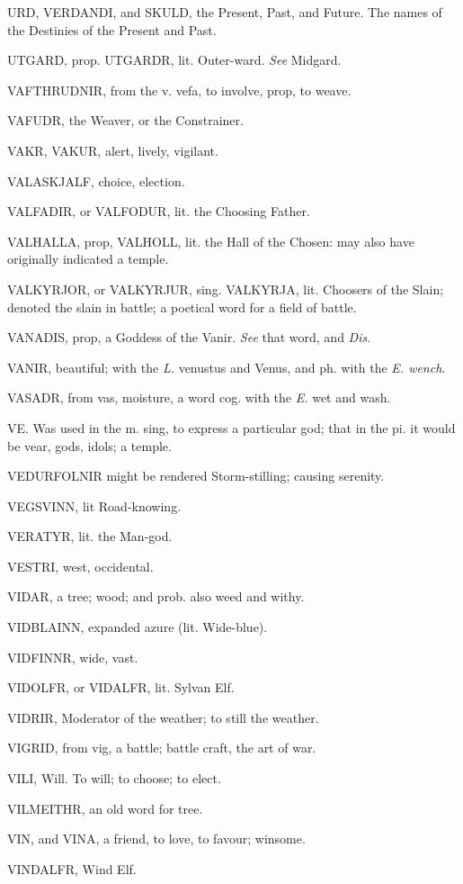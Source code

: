 URD, VERDANDI, and SKULD, the Present, Past, and Future. The names of
the Destinies of the Present and Past.

UTGARD, prop. UTGARDR, lit. Outer-ward. \emph{See} Midgard.

VAFTHRUDNIR, from the v. vefa, to involve, prop, to weave.

VAFUDR, the Weaver, or the Constrainer.

VAKR, VAKUR, alert, lively, vigilant.

VALASKJALF, choice, election.

VALFADIR, or VALFODUR, lit. the Choosing Father.

VALHALLA, prop, VALHOLL, lit. the Hall of the Chosen: may also have
originally indicated a temple.

VALKYRJOR, or VALKYRJUR, sing. VALKYRJA, lit. Choosers of the Slain;
denoted the slain in battle; a poetical word for a field of battle.

VANADIS, prop, a Goddess of the Vanir. \emph{See} that word, and \emph{Dis}.

VANIR, beautiful; with the \emph{L.} venustus and Venus, and ph. with the
\emph{E. wench}.

VASADR, from vas, moisture, a word cog. with the \emph{E.} wet and wash.

VE. Was used in the m. sing, to express a particular god; that in the
pi. it would be vear, gods, idols; a temple.

VEDURFOLNIR might be rendered Storm-stilling; causing serenity.

VEGSVINN, lit Road-knowing.

VERATYR, lit. the Man-god.

VESTRI, west, occidental.

VIDAR, a tree; wood; and prob. also weed and withy.

VIDBLAINN, expanded azure (lit. Wide-blue).

VIDFINNR, wide, vast.

VIDOLFR, or VIDALFR, lit. Sylvan Elf.

VIDRIR, Moderator of the weather; to still the weather.

VIGRID, from vig, a battle; battle craft, the art of war.

VILI, Will. To will; to choose; to elect.

VILMEITHR, an old word for tree.

VIN, and VINA, a friend, to love, to favour; winsome.

VINDALFR, Wind Elf.

